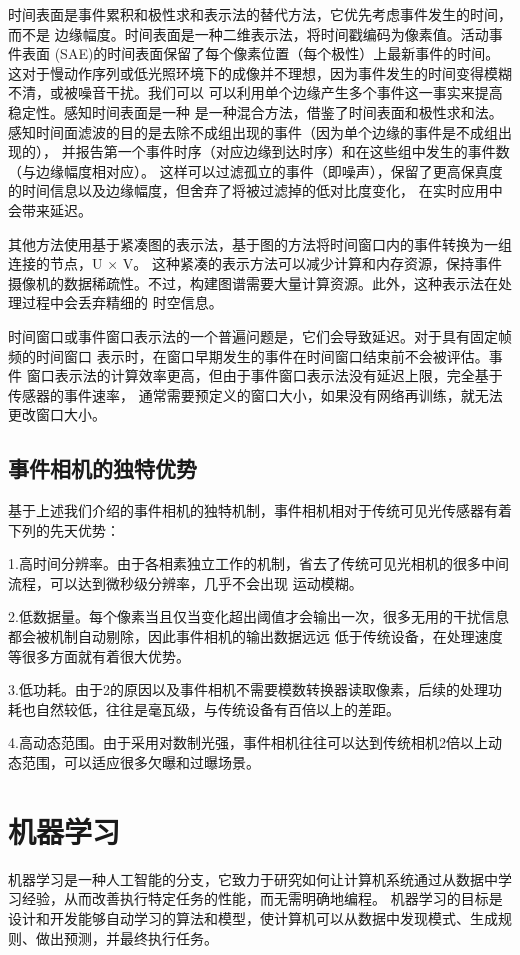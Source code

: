 时间表面是事件累积和极性求和表示法的替代方法\cite{benosman2013event}，它优先考虑事件发生的时间，而不是
边缘幅度。时间表面是一种二维表示法，将时间戳编码为像素值。活动事件表面
(SAE)的时间表面保留了每个像素位置（每个极性）上最新事件的时间。
这对于慢动作序列或低光照环境下的成像并不理想，因为事件发生的时间变得模糊不清，或被噪音干扰。我们可以
可以利用单个边缘产生多个事件这一事实来提高稳定性。感知时间表面是一种
是一种混合方法，借鉴了时间表面和极性求和法。感知时间面滤波的目的是去除不成组出现的事件（因为单个边缘的事件是不成组出现的），
并报告第一个事件时序（对应边缘到达时序）和在这些组中发生的事件数（与边缘幅度相对应）。
这样可以过滤孤立的事件（即噪声），保留了更高保真度的时间信息以及边缘幅度，但舍弃了将被过滤掉的低对比度变化，
在实时应用中会带来延迟。

其他方法使用基于紧凑图的表示法，基于图的方法将时间窗口内的事件转换为一组连接的节点，U × V。
这种紧凑的表示方法可以减少计算和内存资源，保持事件摄像机的数据稀疏性。不过，构建图谱需要大量计算资源。此外，这种表示法在处理过程中会丢弃精细的
时空信息。

时间窗口或事件窗口表示法的一个普遍问题是，它们会导致延迟。对于具有固定帧频的时间窗口
表示时，在窗口早期发生的事件在时间窗口结束前不会被评估。事件
窗口表示法的计算效率更高，但由于事件窗口表示法没有延迟上限，完全基于传感器的事件速率，
通常需要预定义的窗口大小，如果没有网络再训练，就无法更改窗口大小。



\subsection{事件相机的独特优势}
基于上述我们介绍的事件相机的独特机制，事件相机相对于传统可见光传感器有着下列的先天优势：

1.高时间分辨率。由于各相素独立工作的机制，省去了传统可见光相机的很多中间流程，可以达到微秒级分辨率，几乎不会出现
运动模糊。

2.低数据量。每个像素当且仅当变化超出阈值才会输出一次，很多无用的干扰信息都会被机制自动剔除，因此事件相机的输出数据远远
低于传统设备，在处理速度等很多方面就有着很大优势。

3.低功耗。由于2的原因以及事件相机不需要模数转换器读取像素，后续的处理功耗也自然较低，往往是毫瓦级，与传统设备有百倍以上的差距。

4.高动态范围。由于采用对数制光强，事件相机往往可以达到传统相机2倍以上动态范围，可以适应很多欠曝和过曝场景。

\section{机器学习}
机器学习是一种人工智能的分支，它致力于研究如何让计算机系统通过从数据中学习经验，从而改善执行特定任务的性能，而无需明确地编程。
机器学习的目标是设计和开发能够自动学习的算法和模型，使计算机可以从数据中发现模式、生成规则、做出预测，并最终执行任务。

